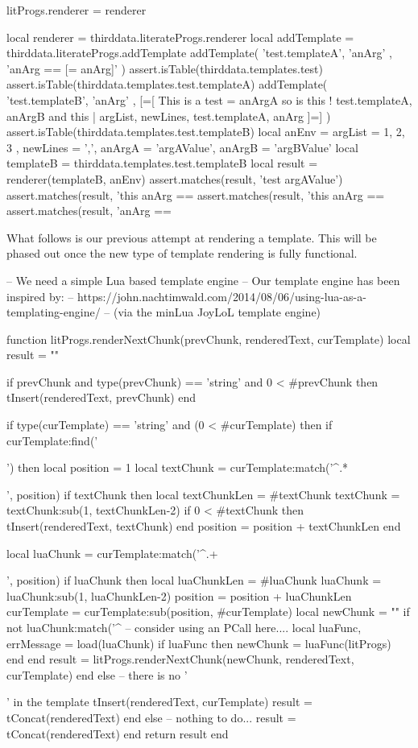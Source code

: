 {{litProgs.renderer = renderer
\stopLuaCode

\startLuaTest
local renderer    = thirddata.literateProgs.renderer
local addTemplate = thirddata.literateProgs.addTemplate
addTemplate( 
  'test.templateA',
  { 'anArg' },
  'anArg == [{{= anArg}}]'
)
assert.isTable(thirddata.templates.test)
assert.isTable(thirddata.templates.test.templateA)
addTemplate(
  'test.templateB',
  { 'anArg' },
[=[
This is a test {{= anArgA }}
so is this {{! test.templateA, anArgB }}
and this {{| argList, newLines, test.templateA, anArg }}
]=]
)
assert.isTable(thirddata.templates.test.templateB)
local anEnv = {
  argList = { 1, 2, 3 },
  newLines = ',\n',
  anArgA = 'argAValue',
  anArgB = 'argBValue'
}
local templateB = thirddata.templates.test.templateB
local result = renderer(templateB, anEnv)
assert.matches(result, 'test argAValue\n')
assert.matches(result, 'this anArg == %
assert.matches(result, 'this anArg == %
assert.matches(result, 'anArg == %
\stopLuaTest
\stopTestCase

\stopTestSuite

What follows is our previous attempt at rendering a template. This will be 
phased out once the new type of template rendering is fully functional. 

\startLuaCode

-- We need a simple Lua based template engine
-- Our template engine has been inspired by:
--   https://john.nachtimwald.com/2014/08/06/using-lua-as-a-templating-engine/
-- (via the minLua JoyLoL template engine)

function litProgs.renderNextChunk(prevChunk, renderedText, curTemplate)
  local result = ""
  
  if prevChunk
    and type(prevChunk) == 'string'
    and 0 < #prevChunk then
    tInsert(renderedText, prevChunk)
  end
  
  if type(curTemplate) == 'string' and (0 < #curTemplate) then
    if curTemplate:find('{{') then
      local position  = 1
      local textChunk = curTemplate:match('^.*{{', position)
      if textChunk then 
        local textChunkLen = #textChunk
        textChunk = textChunk:sub(1, textChunkLen-2)
        if 0 < #textChunk then tInsert(renderedText, textChunk) end
        position = position + textChunkLen
      end
      
      local luaChunk = curTemplate:match('^.+}}', position)
      if luaChunk then
        local luaChunkLen = #luaChunk
        luaChunk = luaChunk:sub(1, luaChunkLen-2)
        position = position + luaChunkLen
        curTemplate = curTemplate:sub(position, #curTemplate)
        local newChunk = ""
        if not luaChunk:match('^%
          -- consider using an PCall here....
          local luaFunc, errMessage = load(luaChunk)
          if luaFunc then
            newChunk = luaFunc(litProgs)
          end
        end
        result = litProgs.renderNextChunk(newChunk, renderedText, curTemplate)
      end
    else -- there is no '{{' in the template
      tInsert(renderedText, curTemplate)
      result = tConcat(renderedText)
    end
  else
    -- nothing to do...
    result = tConcat(renderedText)
  end
  return result
end

}}}}}}
